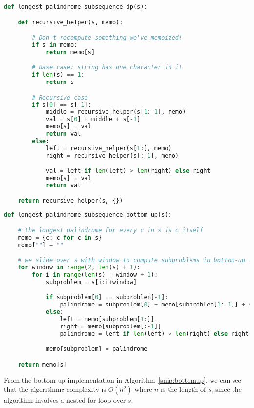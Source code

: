 \documentclass[]{book}
\theoremstyle{definition}
\begin{document}
\begin{lstlisting}[language=Python, caption=Longest Palindrome Subsequence with Memoization, label=snip:withdp]
def longest_palindrome_subsequence_dp(s):

    def recursive_helper(s, memo):

        # Don't recompute something we've memoized!
        if s in memo:
            return memo[s]

        # Base case: string has one character in it
        if len(s) == 1:
            return s

        # Recursive case
        if s[0] == s[-1]:
            middle = recursive_helper(s[1:-1], memo)
            val = s[0] + middle + s[-1]
            memo[s] = val
            return val
        else:
            left = recursive_helper(s[1:], memo)
            right = recursive_helper(s[:-1], memo)

            val = left if len(left) > len(right) else right
            memo[s] = val
            return val

    return recursive_helper(s, {})\end{lstlisting}

    \clearpage

\begin{lstlisting}[language=Python, caption=Longest Palindrome Subsequence Bottom Up DP, label=snip:bottomup]
def longest_palindrome_subsequence_bottom_up(s):

    # the longest palindrome for every c in s is c itself
    memo = {c: c for c in s}
    memo[""] = ""

    # we slide over s with window to compute subproblems in bottom-up fashion
    for window in range(2, len(s) + 1):
        for i in range(len(s) - window + 1):
            subproblem = s[i:i+window]

            if subproblem[0] == subproblem[-1]:
                palindrome = subproblem[0] + memo[subproblem[1:-1]] + subproblem[-1]
            else:
                left = memo[subproblem[1:]]
                right = memo[subproblem[:-1]]
                palindrome = left if len(left) > len(right) else right

            memo[subproblem] = palindrome

    return memo[s]\end{lstlisting}

    From the bottom-up implementation in Algorithm~\ref{snip:bottomup},
    we can see that the algorithmic complexity is $O(n^2)$ where
    $n$ is the length of $s$, since the algorithm involves a nested for loop over $s$.
\end{document}
